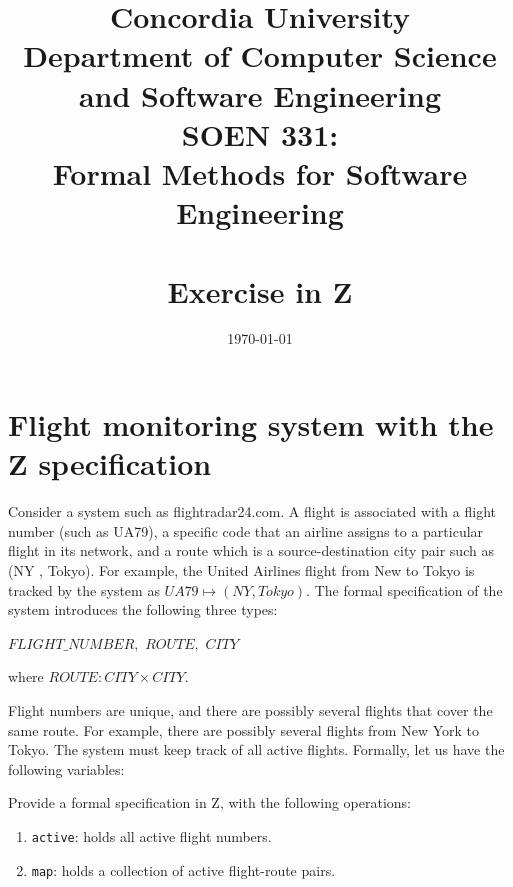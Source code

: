 \documentclass[12pt]{article}
\title{Concordia University\\
Department of Computer Science and Software Engineering\\
\textbf{SOEN 331:\\Formal Methods for Software Engineering}\\
\ \\
\textbf{Exercise in Z}}
\author{}
\date{\today}
\begin{document}
\maketitle

\newpage

\section*{Flight monitoring system with the Z specification}

Consider a system such as flightradar24.com. A flight is associated with a flight number
(such as UA79), a specific code that an airline assigns to a particular flight in its network,
and a route which is a source-destination city pair such as (NY , Tokyo). For example, the
United Airlines flight from New to Tokyo is tracked by the system as $ UA79 \mapsto (NY , Tokyo) .$
The formal specification of the system introduces the following three types:

\indent \(FLIGHT\_NUMBER,\)
\newline \indent \(ROUTE,\)
\newline \indent \(CITY \)

\noindent where
\newline \indent $ROUTE: CITY \times CITY$.

\noindent Flight numbers are unique, and there are possibly several flights that cover the same route.
For example, there are possibly several flights from New York to Tokyo. The system must
keep track of all active flights. Formally, let us have the following variables:

\noindent Provide a formal specification in Z, with the following operations:

\begin{enumerate}
	\item \texttt{active}:  holds all active flight numbers.
	\item \texttt{map}: holds a collection of active flight-route pairs.

\end{enumerate}

\newpage
\end{document}
